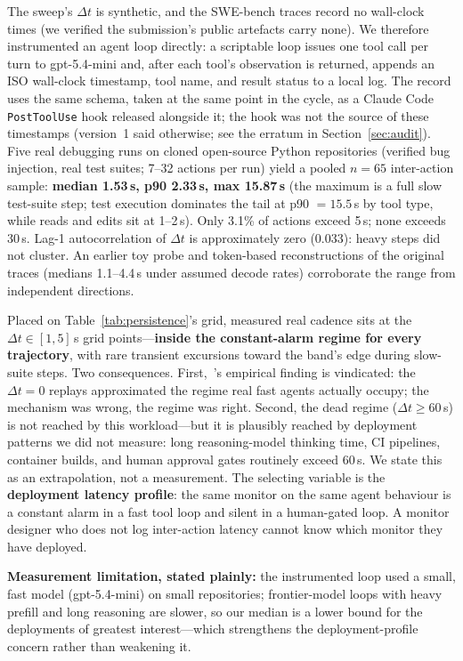 The sweep's $\Delta t$ is synthetic, and the SWE-bench traces record no
wall-clock times (we verified the submission's public artefacts carry none). We
therefore instrumented an agent loop directly: a scriptable loop issues one tool
call per turn to gpt-5.4-mini and, after each tool's observation is returned,
appends an ISO wall-clock timestamp, tool name, and result status to a local
log. The record uses the same schema, taken at the same point in the cycle, as a
Claude Code \texttt{PostToolUse} hook released alongside it; the hook was not
the source of these timestamps (version~1 said otherwise; see the erratum in
Section~\ref{sec:audit}). Five real debugging runs on cloned open-source
Python repositories (verified bug injection, real test suites; 7--32 actions per
run) yield a pooled $n = 65$ inter-action sample: \textbf{median 1.53\,s, p90
2.33\,s, max 15.87\,s} (the maximum is a full slow test-suite step; test
execution dominates the tail at p90 $= 15.5$\,s by tool type, while reads and
edits sit at 1--2\,s). Only 3.1\% of actions exceed 5\,s; none exceeds 30\,s.
Lag-1 autocorrelation of $\Delta t$ is approximately zero (0.033): heavy steps
did not cluster. An earlier toy probe and token-based reconstructions of the
original traces (medians 1.1--4.4\,s under assumed decode rates) corroborate the
range from independent directions.

Placed on Table~\ref{tab:persistence}'s grid, measured real cadence sits at the
$\Delta t \in [1, 5]$\,s grid points---\textbf{inside the constant-alarm regime
for every trajectory}, with rare transient excursions toward the band's edge
during slow-suite steps. Two consequences. First,~\cite{P1}'s empirical finding
is vindicated: the $\Delta t = 0$ replays approximated the regime real fast
agents actually occupy; the mechanism was wrong, the regime was right. Second,
the dead regime ($\Delta t \ge 60$\,s) is not reached by this workload---but it
is plausibly reached by deployment patterns we did not measure: long
reasoning-model thinking time, CI pipelines, container builds, and human
approval gates routinely exceed 60\,s. We state this as an extrapolation, not a
measurement. The selecting variable is the \textbf{deployment latency profile}:
the same monitor on the same agent behaviour is a constant alarm in a fast tool
loop and silent in a human-gated loop. A monitor designer who does not log
inter-action latency cannot know which monitor they have deployed.

\textbf{Measurement limitation, stated plainly:} the instrumented loop used a
small, fast model (gpt-5.4-mini) on small repositories; frontier-model loops with heavy prefill
and long reasoning are slower, so our median is a lower bound for the
deployments of greatest interest---which strengthens the deployment-profile
concern rather than weakening it.

